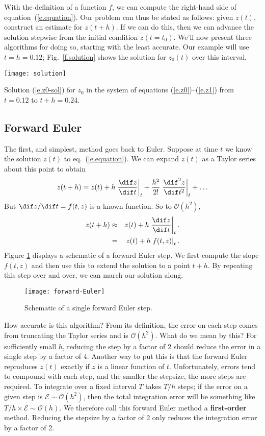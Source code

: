 With the definition of a function $f$, we can compute the right-hand side of equation~(\ref{e.equation}). Our problem can thus be stated as follows:
given $z(t)$, construct an estimate for $z(t+h)$. If we can do this, then we can advance the solution stepwise from the initial condition $z(t=t_{0})$. We'll now present three algorithms for doing so, starting with the least accurate. Our example will use $t=h=0.12$; Fig.~\ref{f.solution} shows the solution for $z_{0}(t)$ over this interval.
\begin{marginfigure}
\texttt{[image: solution]}
\caption[Solution for a sample set of ODE's]{\label{f.solution} Solution (\ref{e.z0-sol}) for $z_{0}$ in the system of equations (\ref{e.z0})--(\ref{e.z1}) from $t=0.12$ to $t+h=0.24$.}
\end{marginfigure}

\subsection{Forward Euler}

The first, and simplest, method goes back to Euler.
Suppose at time $t$ we know the solution $z(t)$ to eq.~(\ref{e.equation}). We can expand $z(t)$ as a Taylor series about this point to obtain
\[ z(t+h) = z(t) + h \left.\frac{\dif z}{\dif t}\right|_{t} + \frac{h^{2}}{2!} \left.\frac{\dif^{2} z}{\dif t^{2}}\right|_{t} + \ldots \]
But $\dif z/\dif t = f(t,z)$ is a known function. So to $\mathcal{O}(h^{2})$,
\begin{eqnarray}
	z(t+h) &\approx& z(t) + h \left.\frac{\dif z}{\dif t}\right|_{t}. \nonumber\\
		&=& z(t) + h \left.f(t,z)\right|_{t}.
\label{e.fEuler}
\end{eqnarray}
Figure \ref{f.forward-Euler} displays a schematic of a forward Euler step. We first compute the slope $f(t,z)$ and then use this to extend the solution to a point $t+h$. By repeating this step over and over, we can march our solution along.

\begin{figure}[htb]
\texttt{[image: forward-Euler]}
\caption{\label{f.forward-Euler}Schematic of a single forward Euler step.}
\end{figure}

How accurate is this  algorithm? From its definition, the error on each step comes from truncating the Taylor series and is $\mathcal{O}(h^{2})$. What do we mean by this? For sufficiently small $h$, reducing the step by a factor of 2 should reduce the error in a single step by a factor of 4. Another way to put this is that the forward Euler reproduces $z(t)$ exactly if $z$ is a linear function of $t$.
Unfortunately, errors tend to compound with each step, and the smaller the stepsize, the more steps are required. To integrate over a fixed interval $T$ takes $T/h$ steps; if the error on a given step is $\mathcal{E}\sim \mathcal{O}(h^{2})$, then the total integration error will be something like $T/h \times \mathcal{E} \sim \mathcal{O}(h)$.  We therefore call this forward Euler method a \textbf{first-order} method. Reducing the stepsize by a factor of 2 only reduces the integration error by a factor of 2.

